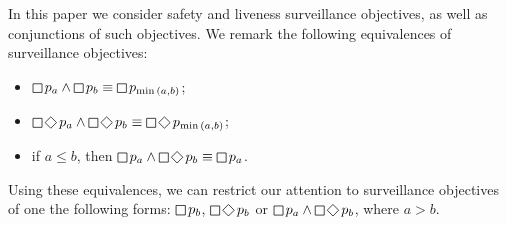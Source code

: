 In this paper we consider safety and liveness surveillance objectives, as well as conjunctions of such objectives. We remark the following equivalences of surveillance objectives:
\begin{itemize}
\item $\LTLglobally p_a \wedge \LTLglobally p_b \equiv \LTLglobally p_{\min{(a,b)}}$;
\item $\LTLglobally\LTLfinally p_a \wedge \LTLglobally\LTLfinally p_b \equiv \LTLglobally\LTLfinally p_{\min{(a,b)}}$;
\item if $a \leq b$, then $\LTLglobally p_a \wedge \LTLglobally\LTLfinally p_b \equiv\LTLglobally p_a$. 
\end{itemize}
Using these equivalences, we can restrict our attention to surveillance objectives of one the following  forms: $\LTLglobally p_b$, $\LTLglobally\LTLfinally p_b$ or $\LTLglobally p_a \wedge \LTLglobally\LTLfinally p_b$, where $a > b$. 
 






